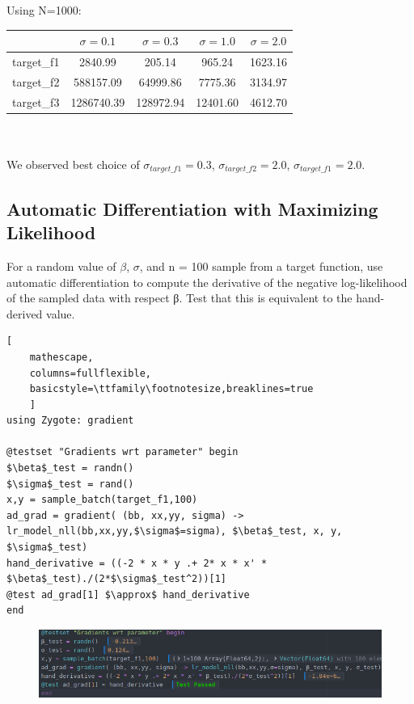 \documentclass[12pt,letter]{article}
\begin{document}
\begin{enumerate}
  Using N=1000:\\
  \begin{tabular}{|c|c|c|c|c|}
    \hline
    & $\sigma=0.1$ & $\sigma=0.3$ & $\sigma=1.0$ & $\sigma=2.0$ \\\hline
    target\_f1 & 2840.99 & 205.14 & 965.24 & 1623.16 \\\hline
    target\_f2 & 588157.09 & 64999.86 & 7775.36 & 3134.97 \\\hline
    target\_f3 & 1286740.39 & 128972.94 & 12401.60 & 4612.70 \\\hline
  \end{tabular}\\
  \\
  We observed best choice of $\sigma_{target\_f1} = 0.3$, $\sigma_{target\_f2} = 2.0$, $\sigma_{target\_f1} = 2.0$.

\end{enumerate}
\pagebreak
\subsection{Automatic Differentiation with Maximizing Likelihood}

For a random value of $\beta$, $\sigma$, and n = 100 sample from a target function, use automatic differentiation to compute the derivative of the negative log-likelihood of the sampled data with respect β. Test that this is equivalent to the hand-derived value.\\

\begin{lstlisting}[
    mathescape,
    columns=fullflexible,
    basicstyle=\ttfamily\footnotesize,breaklines=true
    ]
using Zygote: gradient

@testset "Gradients wrt parameter" begin
$\beta$_test = randn()
$\sigma$_test = rand()
x,y = sample_batch(target_f1,100)
ad_grad = gradient( (bb, xx,yy, sigma) -> lr_model_nll(bb,xx,yy,$\sigma$=sigma), $\beta$_test, x, y, $\sigma$_test)
hand_derivative = ((-2 * x * y .+ 2* x * x' * $\beta$_test)./(2*$\sigma$_test^2))[1]
@test ad_grad[1] $\approx$ hand_derivative
end
\end{lstlisting}

\begin{figure}[h]
  \centering
  \includegraphics[width=17cm,keepaspectratio]{imgs/test3.png}
\end{figure}
\end{document}
